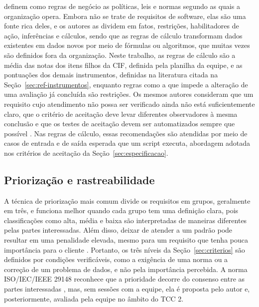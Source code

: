  definem como regras de negócio as políticas, leis e normas segundo as
quais a organização opera. Embora não se trate de requisitos de software, elas são uma fonte rica deles, e os autores
as dividem em fatos, restrições, habilitadores de ação, inferências e cálculos, sendo que as regras de cálculo
transformam dados existentes em dados novos por meio de fórmulas ou algoritmos, que muitas vezes são definidos fora
da organização. Neste trabalho, as regras de cálculo são a média das notas dos itens filhos da CIF, definida pela
planilha da equipe, e as pontuações dos demais instrumentos, definidas na literatura citada na
Seção~\ref{sec:ref-instrumentos}, enquanto regras como a que impede a alteração de uma avaliação já concluída são
restrições. Os mesmos autores consideram que um requisito cujo atendimento não possa ser verificado ainda não está
suficientemente claro, que o critério de aceitação deve levar diferentes observadores à mesma conclusão e que os
testes de aceitação devem ser automatizados sempre que possível \cite[p.~347--348]{wiegers2013software}. Nas regras
de cálculo, essas recomendações são atendidas por meio de casos de entrada e de saída esperada que um script executa,
abordagem adotada nos critérios de aceitação da Seção~\ref{sec:especificacao}.

\subsection{Priorização e rastreabilidade}
\label{sec:ref-req-prioridade}

A técnica de priorização mais comum divide os requisitos em grupos, geralmente em três, e funciona melhor quando cada
grupo tem uma definição clara, pois classificações como alta, média e baixa são interpretadas de maneiras diferentes
pelas partes interessadas. Além disso, deixar de atender a um padrão pode resultar em uma penalidade elevada, mesmo para um requisito que tenha pouca importância para o cliente
\cite[p.~73,~76]{berander2005prioritization}. Portanto, os três níveis da Seção~\ref{sec:criterios} são definidos por
condições verificáveis, como a exigência de uma norma ou a correção de um problema de dados, e não pela importância
percebida. A norma ISO/IEC/IEEE 29148 reconhece que a prioridade decorre do consenso entre as partes interessadas
\cite[p.~15]{iso29148:2018}, mas, sem sessões com a equipe, ela é proposta pelo autor e, posteriormente, avaliada
pela equipe no âmbito do TCC 2.

